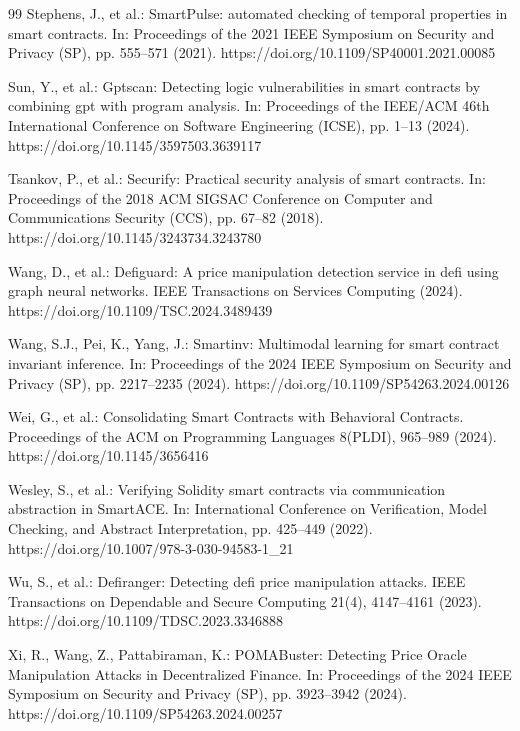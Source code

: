 \documentclass[pdflatex,sn-basic]{sn-jnl}%
\theoremstyle{thmstyleone}%
\theoremstyle{thmstyletwo}%
\theoremstyle{thmstylethree}%
\begin{document}
\begin{thebibliography}{99}
Stephens, J., et al.: SmartPulse: automated checking of temporal properties in smart contracts. In: Proceedings of the 2021 IEEE Symposium on Security and Privacy (SP), pp. 555--571 (2021). https://doi.org/10.1109/SP40001.2021.00085

Sun, Y., et al.: Gptscan: Detecting logic vulnerabilities in smart contracts by combining gpt with program analysis. In: Proceedings of the IEEE/ACM 46th International Conference on Software Engineering (ICSE), pp. 1--13 (2024). https://doi.org/10.1145/3597503.3639117

Tsankov, P., et al.: Securify: Practical security analysis of smart contracts. In: Proceedings of the 2018 ACM SIGSAC Conference on Computer and Communications Security (CCS), pp. 67--82 (2018). https://doi.org/10.1145/3243734.3243780

Wang, D., et al.: Defiguard: A price manipulation detection service in defi using graph neural networks. IEEE Transactions on Services Computing (2024). https://doi.org/10.1109/TSC.2024.3489439

Wang, S.J., Pei, K., Yang, J.: Smartinv: Multimodal learning for smart contract invariant inference. In: Proceedings of the 2024 IEEE Symposium on Security and Privacy (SP), pp. 2217--2235 (2024). https://doi.org/10.1109/SP54263.2024.00126

Wei, G., et al.: Consolidating Smart Contracts with Behavioral Contracts. Proceedings of the ACM on Programming Languages 8(PLDI), 965--989 (2024). https://doi.org/10.1145/3656416

Wesley, S., et al.: Verifying Solidity smart contracts via communication abstraction in SmartACE. In: International Conference on Verification, Model Checking, and Abstract Interpretation, pp. 425--449 (2022). https://doi.org/10.1007/978-3-030-94583-1_21

Wu, S., et al.: Defiranger: Detecting defi price manipulation attacks. IEEE Transactions on Dependable and Secure Computing 21(4), 4147--4161 (2023). https://doi.org/10.1109/TDSC.2023.3346888

Xi, R., Wang, Z., Pattabiraman, K.: POMABuster: Detecting Price Oracle Manipulation Attacks in Decentralized Finance. In: Proceedings of the 2024 IEEE Symposium on Security and Privacy (SP), pp. 3923--3942 (2024). https://doi.org/10.1109/SP54263.2024.00257


\end{thebibliography}
\end{document}
